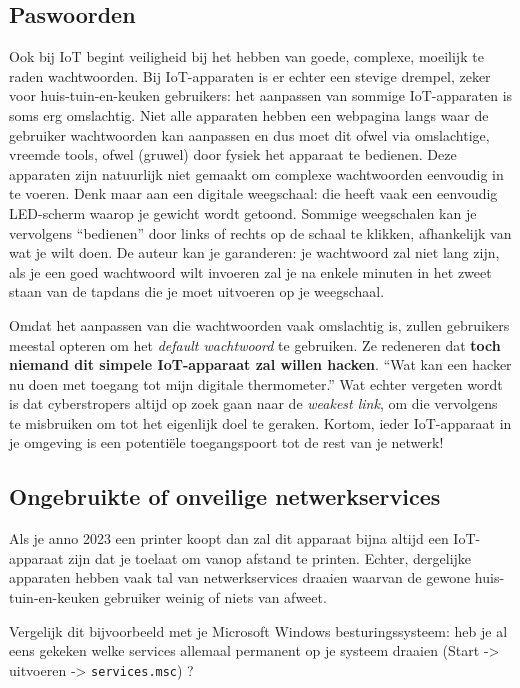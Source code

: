 \documentclass[
  10pt,
  dutch,
  paper=a4,
  ,captions=tableheading
]{scrbook}
\begin{document}
\subsection{Paswoorden}\label{paswoorden}

Ook bij IoT begint veiligheid bij het hebben van goede, complexe,
moeilijk te raden wachtwoorden. Bij IoT-apparaten is er echter een
stevige drempel, zeker voor huis-tuin-en-keuken gebruikers: het
aanpassen van sommige IoT-apparaten is soms erg omslachtig. Niet alle
apparaten hebben een webpagina langs waar de gebruiker wachtwoorden kan
aanpassen en dus moet dit ofwel via omslachtige, vreemde tools, ofwel
(gruwel) door fysiek het apparaat te bedienen. Deze apparaten zijn
natuurlijk niet gemaakt om complexe wachtwoorden eenvoudig in te voeren.
Denk maar aan een digitale weegschaal: die heeft vaak een eenvoudig
LED-scherm waarop je gewicht wordt getoond. Sommige weegschalen kan je
vervolgens ``bedienen'' door links of rechts op de schaal te klikken,
afhankelijk van wat je wilt doen. De auteur kan je garanderen: je
wachtwoord zal niet lang zijn, als je een goed wachtwoord wilt invoeren
zal je na enkele minuten in het zweet staan van de tapdans die je moet
uitvoeren op je weegschaal.

Omdat het aanpassen van die wachtwoorden vaak omslachtig is, zullen
gebruikers meestal opteren om het \emph{default wachtwoord} te
gebruiken. Ze redeneren dat \textbf{toch niemand dit simpele
IoT-apparaat zal willen hacken}. ``Wat kan een hacker nu doen met
toegang tot mijn digitale thermometer.'' Wat echter vergeten wordt is
dat cyberstropers altijd op zoek gaan naar de \emph{weakest link}, om
die vervolgens te misbruiken om tot het eigenlijk doel te geraken.
Kortom, ieder IoT-apparaat in je omgeving is een potentiële
toegangspoort tot de rest van je netwerk!

\subsection{Ongebruikte of onveilige
netwerkservices}\label{ongebruikte-of-onveilige-netwerkservices}

Als je anno 2023 een printer koopt dan zal dit apparaat bijna altijd een
IoT-apparaat zijn dat je toelaat om vanop afstand te printen. Echter,
dergelijke apparaten hebben vaak tal van netwerkservices draaien waarvan
de gewone huis-tuin-en-keuken gebruiker weinig of niets van afweet.

\begin{tipblock}
Vergelijk dit bijvoorbeeld met je Microsoft Windows besturingssysteem:
heb je al eens gekeken welke services allemaal permanent op je systeem
draaien (Start -\textgreater{} uitvoeren -\textgreater{}
\texttt{services.msc}) ?
\end{tipblock}
\end{document}
